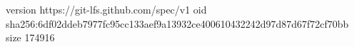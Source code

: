 version https://git-lfs.github.com/spec/v1
oid sha256:6df02ddeb7977fc95cc133aef9a13932ce400610432242d97d87d67f72cf70bb
size 174916
